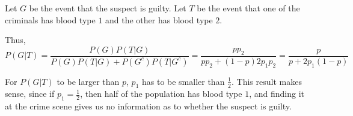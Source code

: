 Let $G$ be the event that the suspect is guilty. Let $T$ be the event that
one of the criminals has blood type $1$ and the other has blood type $2$.

Thus,
$$P(G|T) = \frac{P(G)P(T|G)}{P(G)P(T|G) + P(G^{c})P(T|G^{c})} = 
\frac{pp_{2}}{pp_{2} + (1-p)2p_{1}p_{2}} = \frac{p}{p + 2p_{1}(1 - p)}$$

For $P(G|T)$ to be larger than $p$, $p_{1}$ has to be smaller than $\frac{1}
{2}$. This result makes sense, since if $p_{1} = \frac{1}{2}$, then half of the
population has blood type $1$, and finding it at the crime scene gives us no
information as to whether the suspect is guilty.